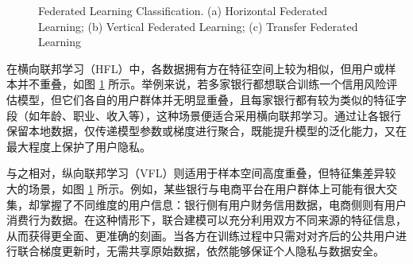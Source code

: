 \vspace{-0.1cm}
\begin{figure}[!h]
	\centering
	\hspace{0.01\textwidth}
	\hspace{0.01\textwidth}
	
	{\centering \wuhao Federated Learning Classification. (a) Horizontal Federated Learning; (b) Vertical Federated Learning; (c) Transfer Federated Learning}	
	\label{fig:FedClass}
\end{figure}
\vspace{-0.35cm}
在横向联邦学习（HFL）中，各数据拥有方在特征空间上较为相似，但用户或样本并不重叠\citep{yang2019federated,liu2019communication}，如图 \ref{fig:FedClass} 所示。举例来说，若多家银行都想联合训练一个信用风险评估模型，但它们各自的用户群体并无明显重叠，且每家银行都有较为类似的特征字段（如年龄、职业、收入等），这种场景便适合采用横向联邦学习。通过让各银行保留本地数据，仅传递模型参数或梯度进行聚合，既能提升模型的泛化能力，又在最大程度上保护了用户隐私。

与之相对，纵向联邦学习（VFL）则适用于样本空间高度重叠，但特征集差异较大的场景\citep{liu2020secure,chen2020vafl}，如图 \ref{fig:FedClass} 所示。例如，某些银行与电商平台在用户群体上可能有很大交集，却掌握了不同维度的用户信息：银行侧有用户财务信用数据，电商侧则有用户消费行为数据。在这种情形下，联合建模可以充分利用双方不同来源的特征信息，从而获得更全面、更准确的刻画。当各方在训练过程中只需对对齐后的公共用户进行联合梯度更新时，无需共享原始数据，依然能够保证个人隐私与数据安全。

